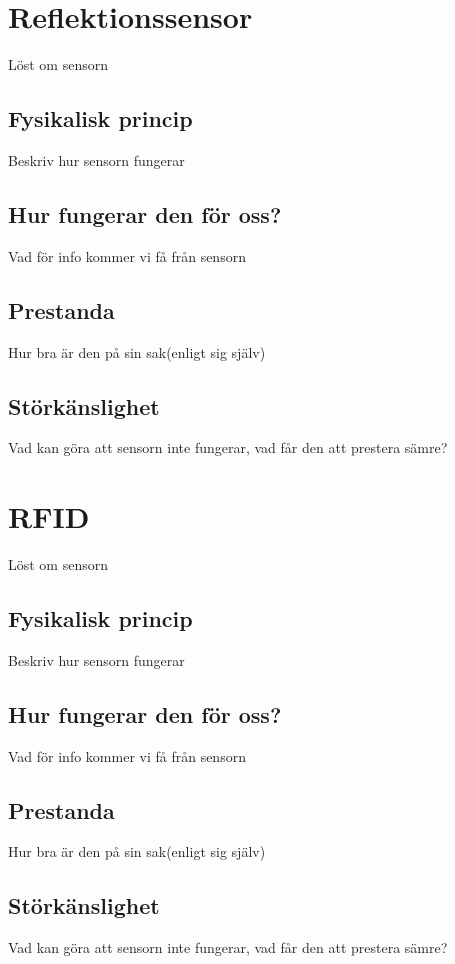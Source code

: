 \documentclass[11pt]{article}
\begin{document}
\begin{flushleft}
 
\section{Reflektionssensor}
Löst om sensorn

 \subsection{Fysikalisk princip}
 Beskriv hur sensorn fungerar
 
 \subsection{Hur fungerar den för oss?}
 Vad för info kommer vi få från sensorn
 
 \subsection{Prestanda}
 Hur bra är den på sin sak(enligt sig själv)

 \subsection{Störkänslighet}
 Vad kan göra att sensorn inte fungerar, vad får den att prestera sämre?
 
\section{RFID}
Löst om sensorn

 \subsection{Fysikalisk princip}
 Beskriv hur sensorn fungerar
 
 \subsection{Hur fungerar den för oss?}
 Vad för info kommer vi få från sensorn
 
 \subsection{Prestanda}
 Hur bra är den på sin sak(enligt sig själv)

 \subsection{Störkänslighet}
 Vad kan göra att sensorn inte fungerar, vad får den att prestera sämre?
 


\end{flushleft}
\end{document}
